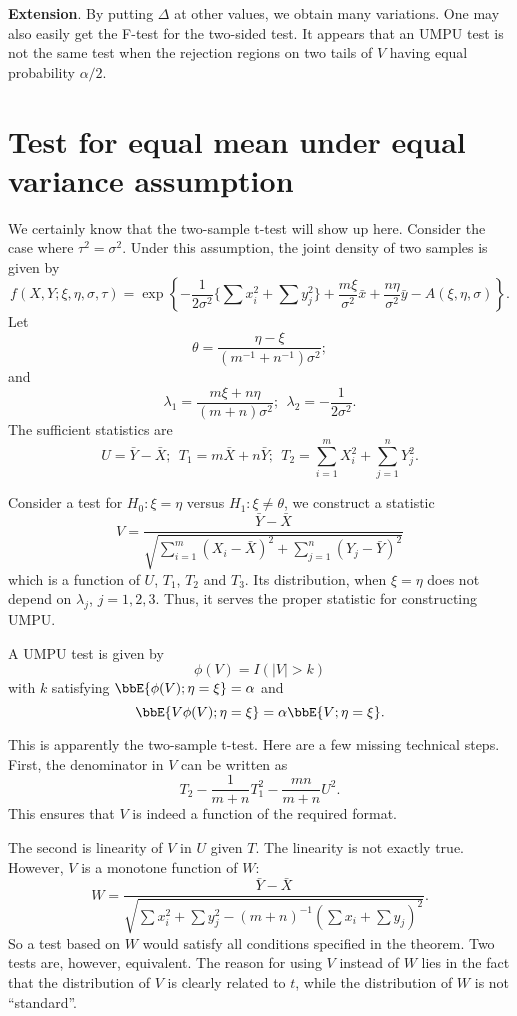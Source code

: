 {\bf Extension}.
By putting $\Delta$ at other values, we obtain many variations.
One may also easily get the F-test for the two-sided test. 
It appears that an UMPU test is not the same test when the
rejection regions on two tails of $V$ having equal probability
$\alpha/2$. 

\section{Test for equal mean under equal variance assumption}

We certainly know that the two-sample t-test will show up here.
Consider the case where $\tau^2 = \sigma^2$. Under this
assumption, the joint density of two samples is given by
\[
f(X, Y; \xi, \eta, \sigma, \tau)
=
\exp \left \{ 
- \frac{1}{2 \sigma^2} \{\sum x_i^2 + \sum y_j^2 \}
+ \frac{m\xi}{\sigma^2} \bar x + \frac{n \eta}{\sigma^2} \bar y 
- A( \xi, \eta, \sigma) 
\right \}.
\]
Let
\[
\theta = \frac{\eta - \xi}{(m^{-1} +n^{-1} )\sigma^2};
\]
and
\[
\lambda_1 = \frac{m \xi + n \eta}{(m+n)\sigma^2}; ~~
\lambda_2 = -\frac{1}{2\sigma^2}.
\]
The sufficient statistics are
\[
U = \bar Y - \bar X;~~ 
T_1 = m \bar X + n \bar Y; ~~ 
T_2= \sum_{i=1}^m X_i^2 + \sum_{j=1}^n Y_j^2.
\]

Consider a test for $H_0: \xi = \eta$ versus $H_1: \xi \neq \theta$,
we construct a statistic
\[
V 
= \frac{\bar Y - \bar X}
{\sqrt{ \sum_{i=1}^m (X_i - \bar X)^2 + \sum_{j=1}^n (Y_j - \bar Y)^2}}
\]
which is a function of $U$, $T_1$, $T_2$ and $T_3$.
Its distribution, when $\xi = \eta$ does not depend on $\lambda_j$, $j=1, 2, 3$.
Thus, it serves the proper statistic for constructing UMPU.

A UMPU test is given by
\[
\phi(V) = I( |V| > k)
\]
with $k$ satisfying $\bbE\{\phi(V); \eta = \xi\} = \alpha$ and 
\[
\bbE\{V\phi(V); \eta = \xi\} = \alpha \bbE\{V; \eta=\xi\}.
\]

This is apparently the two-sample t-test.
Here are a few missing technical steps. First, the denominator
in $V$ can be written as
\[
T_2 - \frac{1}{m+n} T_1^2 - \frac{mn}{m+n} U^2.
\]
This ensures that $V$ is indeed a function of the required format.

The second is linearity of $V$ in $U$ given $T$. The linearity is not
exactly true. However, $V$ is a monotone function of $W$:
\[
W 
= \frac{\bar Y - \bar X}{\sqrt{ \sum x_i^2 + \sum y_j^2 
 - (m+n)^{-1}(\sum x_i + \sum y_j)^2}}.
\]
So a test based on $W$ would satisfy all conditions specified in the theorem.
Two tests are, however, equivalent.
The reason for using $V$ instead of $W$ lies in the fact that the
distribution of $V$ is clearly related to $t$, while the distribution of $W$
is not ``standard''.

